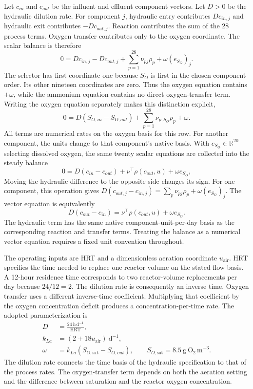 Let $c_{in}$ and $c_{out}$ be the influent and effluent component vectors. Let $D>0$ be the hydraulic dilution rate. For component $j$, hydraulic entry contributes $Dc_{in,j}$ and hydraulic exit contributes $-Dc_{out,j}$. Reaction contributes the sum of the 28 process terms. Oxygen transfer contributes only to the oxygen coordinate. The scalar balance is therefore
\[
0=Dc_{in,j}-Dc_{out,j}
+\sum_{p=1}^{28}\nu_{pj}\rho_p+\omega(e_{S_O})_j.
\]
The selector has first coordinate one because $S_O$ is first in the chosen component order. Its other nineteen coordinates are zero. Thus the oxygen equation contains $+\omega$, while the ammonium equation contains no direct oxygen-transfer term. Writing the oxygen equation separately makes this distinction explicit,
\[
0=D(S_{O,in}-S_{O,out})+\sum_{p=1}^{28}\nu_{p,S_O}\rho_p+\omega.
\]
All terms are numerical rates on the oxygen basis for this row. For another component, the units change to that component's native basis. With $e_{S_O}\in\mathbb{R}^{20}$ selecting dissolved oxygen, the same twenty scalar equations are collected into the steady balance
\begin{equation}
0=D(c_{in}-c_{out})+\nu^\top\rho(c_{out},u)+\omega e_{S_O},
\label{eq:reactor_steady_balance}
\end{equation}
Moving the hydraulic difference to the opposite side changes its sign. For one component, this operation gives $D(c_{out,j}-c_{in,j})=\sum_p\nu_{pj}\rho_p+\omega(e_{S_O})_j$. The vector equation is equivalently
\begin{equation}
D(c_{out}-c_{in})=\nu^\top\rho(c_{out},u)+\omega e_{S_O}.
\label{eq:reactor_steady_difference}
\end{equation}
The hydraulic term has the same native component-unit-per-day basis as the corresponding reaction and transfer terms. Treating the balance as a numerical vector equation requires a fixed unit convention throughout.

The operating inputs are HRT and a dimensionless aeration coordinate $u_{\mathrm{air}}$. HRT specifies the time needed to replace one reactor volume on the stated flow basis. A 12-hour residence time corresponds to two reactor-volume replacements per day because $24/12=2$. The dilution rate is consequently an inverse time. Oxygen transfer uses a different inverse-time coefficient. Multiplying that coefficient by the oxygen concentration deficit produces a concentration-per-time rate. The adopted parameterization is
\begin{align}
D&=\frac{24\ \mathrm{h\,d}^{-1}}{\mathrm{HRT}},\label{eq:reactor_dilution}\\
k_{La}&=(2+18u_{\mathrm{air}})\ \mathrm{d}^{-1},\label{eq:reactor_transfer_coefficient}\\
\omega&=k_{La}(S_{O,\mathrm{sat}}-S_{O,out}),\qquad
S_{O,\mathrm{sat}}=8.5\ \mathrm{g\ O_2\,m}^{-3}.
\label{eq:reactor_oxygen_transfer}
\end{align}
The dilution rate connects the time basis of the hydraulic specification to that of the process rates. The oxygen-transfer term depends on both the aeration setting and the difference between saturation and the reactor oxygen concentration.

